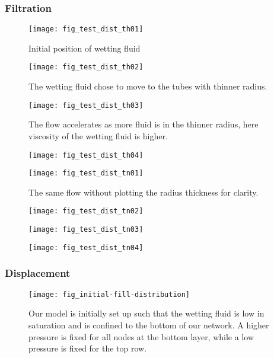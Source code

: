 	\subsubsection{Filtration}
		\begin{figure}[H]
			\centering
			\texttt{[image: fig\_test\_dist\_th01]}
			\caption{Initial position of wetting fluid}
		\end{figure}

		\begin{figure}[H]
			\centering
			\texttt{[image: fig\_test\_dist\_th02]}
			\caption{The wetting fluid chose to move to the tubes with thinner radius.}
			
		\end{figure}
		
		\begin{figure}[H]
			\centering
			\texttt{[image: fig\_test\_dist\_th03]}
			\caption{The flow accelerates as more fluid is in the thinner radius, here viscosity of the wetting fluid is higher.}
		\end{figure}

		\begin{figure}[H]
			\centering
			\texttt{[image: fig\_test\_dist\_th04]}
			\caption{}
		\end{figure}
		
		\begin{figure}[H]
			\centering
			\texttt{[image: fig\_test\_dist\_tn01]}
			\caption{The same flow without plotting the radius thickness for clarity.}
		\end{figure}

		\begin{figure}[H]
			\centering
			\texttt{[image: fig\_test\_dist\_tn02]}
			\caption{}
			
		\end{figure}
		
		\begin{figure}[H]
			\centering
			\texttt{[image: fig\_test\_dist\_tn03]}
			\caption{}
		\end{figure}

		\begin{figure}[H]
			\centering
			\texttt{[image: fig\_test\_dist\_tn04]}
			\caption{}
		\end{figure}
		
		
	\subsubsection{Displacement}
		\begin{figure}[H]
			\centering
			\texttt{[image: fig\_initial-fill-distribution]}
			\caption{Our model is initially set up such that the wetting fluid is low in saturation and is confined to the bottom of our network. A higher pressure is fixed for all nodes at the bottom layer, while a  low pressure is fixed for the top row.}
			\label{fig_plot-sat-vs-time-disp-one}
		\end{figure}

